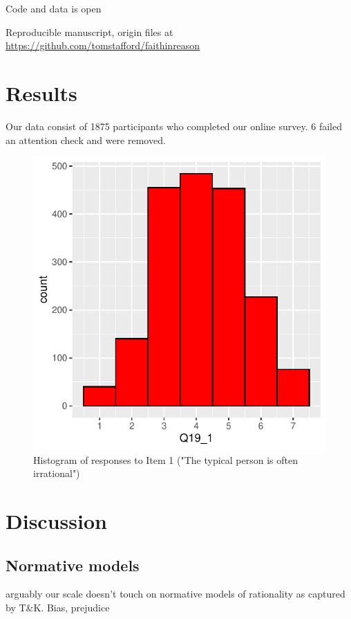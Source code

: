 \documentclass[
  ,jou,floatsintext]{apa6}
\begin{document}
Code and data is open

Reproducible manuscript, origin files at \url{https://github.com/tomstafford/faithinreason}

\hypertarget{results}{%
\section{Results}\label{results}}

Our data consist of 1875 participants who completed our online survey. 6 failed an attention check and were removed.

\begin{figure}

{\centering \includegraphics[width=0.75\linewidth]{faithinreason_files/figure-latex/ourhistogram-1} 

}

\caption{Histogram of responses to Item 1 ("The typical person is often irrational")}\label{fig:ourhistogram}
\end{figure}

\hypertarget{discussion}{%
\section{Discussion}\label{discussion}}

\hypertarget{normative-models}{%
\subsection{Normative models}\label{normative-models}}

arguably our scale doesn't touch on normative models of rationality as captured by T\&K. Bias, prejudice
\end{document}
